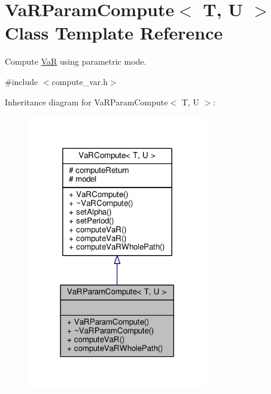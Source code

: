 \hypertarget{classVaRParamCompute}{}\section{Va\+R\+Param\+Compute$<$ T, U $>$ Class Template Reference}
\label{classVaRParamCompute}


Compute \hyperlink{classVaR}{VaR} using parametric mode.  




{\ttfamily \#include $<$compute\+\_\+var.\+h$>$}



Inheritance diagram for Va\+R\+Param\+Compute$<$ T, U $>$\+:
\nopagebreak
\begin{figure}[H]
\begin{center}
\leavevmode
\includegraphics[width=222pt]{classVaRParamCompute__inherit__graph}
\end{center}
\end{figure}


